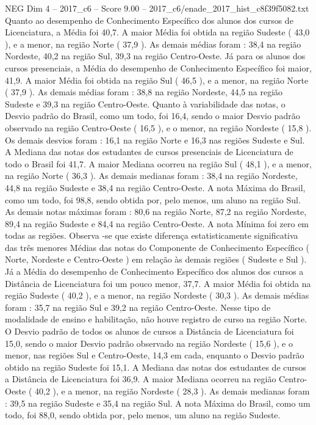 \begin{textsample}{NEG Dim 4 – 2017\_c6 – Score 9.00 – 2017\_c6/enade\_2017\_hist\_c8f39f5082.txt}
Quanto ao desempenho de Conhecimento Específico dos alunos dos cursos de Licenciatura, a Média foi 40,7.
A maior Média foi obtida na região Sudeste ( 43,0 ), e a menor, na região Norte ( 37,9 ).
As demais médias foram : 38,4 na região Nordeste, 40,2 na região Sul, 39,3 na região Centro-Oeste.
Já para os alunos dos cursos presenciais, a Média do desempenho de Conhecimento Específico foi maior, 41,9.
A maior Média foi obtida na região Sul ( 46,5 ), e a menor, na região Norte ( 37,9 ).
As demais médias foram : 38,8 na região Nordeste, 44,5 na região Sudeste e 39,3 na região Centro-Oeste.
Quanto à variabilidade das notas, o Desvio padrão do Brasil, como um todo, foi 16,4, sendo o maior Desvio padrão observado na região Centro-Oeste ( 16,5 ), e o menor, na região Nordeste ( 15,8 ).
Os demais desvios foram : 16,1 na região Norte e 16,3 nas regiões Sudeste e Sul.
A Mediana das notas dos estudantes de cursos presenciais de Licenciatura de todo o Brasil foi 41,7.
A maior Mediana ocorreu na região Sul ( 48,1 ), e a menor, na região Norte ( 36,3 ).
As demais medianas foram : 38,4 na região Nordeste, 44,8 na região Sudeste e 38,4 na região Centro-Oeste.
A nota Máxima do Brasil, como um todo, foi 98,8, sendo obtida por, pelo menos, um aluno na região Sul.
As demais notas máximas foram : 80,6 na região Norte, 87,2 na região Nordeste, 89,4 na região Sudeste e 84,4 na região Centro-Oeste.
A nota Mínima foi zero em todas as regiões.
Observa -se que existe diferença estatisticamente significativa das três menores Médias das notas do Componente de Conhecimento Específico ( Norte, Nordeste e Centro-Oeste ) em relação às demais regiões ( Sudeste e Sul ).
Já a Média do desempenho de Conhecimento Específico dos alunos dos cursos a Distância de Licenciatura foi um pouco menor, 37,7.
A maior Média foi obtida na região Sudeste ( 40,2 ), e a menor, na região Nordeste ( 30,3 ).
As demais médias foram : 35,7 na região Sul e 39,2 na região Centro-Oeste.
Nesse tipo de modalidade de ensino e habilitação, não houve registro de curso na região Norte.
O Desvio padrão de todos os alunos de cursos a Distância de Licenciatura foi 15,0, sendo o maior Desvio padrão observado na região Nordeste ( 15,6 ), e o menor, nas regiões Sul e Centro-Oeste, 14,3 em cada, enquanto o Desvio padrão obtido na região Sudeste foi 15,1.
A Mediana das notas dos estudantes de cursos a Distância de Licenciatura foi 36,9.
A maior Mediana ocorreu na região Centro-Oeste ( 40,2 ), e a menor, na região Nordeste ( 28,3 ).
As demais medianas foram : 39,5 na região Sudeste e 35,4 na região Sul.
A nota Máxima do Brasil, como um todo, foi 88,0, sendo obtida por, pelo menos, um aluno na região Sudeste.

\end{textsample}
